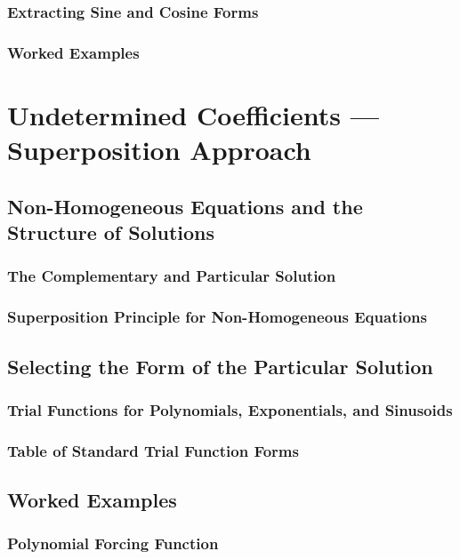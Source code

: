 \documentclass[10pt]{article}
\begin{document}
    \subsubsection{Extracting Sine and Cosine Forms}
    \subsubsection{Worked Examples}

\section{Undetermined Coefficients --- Superposition Approach}

\subsection{Non-Homogeneous Equations and the Structure of Solutions}
    \subsubsection{The Complementary and Particular Solution}
    \subsubsection{Superposition Principle for Non-Homogeneous Equations}

\subsection{Selecting the Form of the Particular Solution}
    \subsubsection{Trial Functions for Polynomials, Exponentials, and Sinusoids}
    \subsubsection{Table of Standard Trial Function Forms}

\subsection{Worked Examples}
    \subsubsection{Polynomial Forcing Function}
\end{document}
